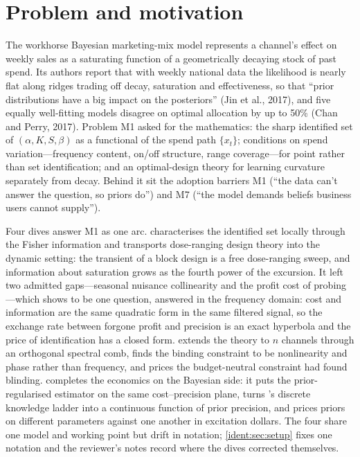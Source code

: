 \section{Problem and motivation}

The workhorse Bayesian marketing-mix model represents a channel's effect on weekly sales as a saturating function of a geometrically decaying stock of past spend. Its authors report that with weekly national data the likelihood is nearly flat along ridges trading off decay, saturation and effectiveness, so that ``prior distributions have a big impact on the posteriors'' (Jin et al., 2017), and five equally well-fitting models disagree on optimal allocation by up to 50\% (Chan and Perry, 2017). Problem M1 asked for the mathematics: the sharp identified set of $(\alpha, K, S, \beta)$ as a functional of the spend path $\{x_t\}$; conditions on spend variation---frequency content, on/off structure, range coverage---for point rather than set identification; and an optimal-design theory for learning curvature separately from decay. Behind it sit the adoption barriers M1 (``the data can't answer the question, so priors do'') and M7 (``the model demands beliefs business users cannot supply'').

Four dives answer M1 as one arc.  characterises the identified set locally through the Fisher information and transports dose-ranging design theory into the dynamic setting: the transient of a block design is a free dose-ranging sweep, and information about saturation grows as the fourth power of the excursion. It left two admitted gaps---seasonal nuisance collinearity and the profit cost of probing---which  shows to be one question, answered in the frequency domain: cost and information are the same quadratic form in the same filtered signal, so the exchange rate between forgone profit and precision is an exact hyperbola and the price of identification has a closed form.  extends the theory to $n$ channels through an orthogonal spectral comb, finds the binding constraint to be nonlinearity and phase rather than frequency, and prices the budget-neutral constraint  had found blinding.  completes the economics on the Bayesian side: it puts the prior-regularised estimator on the same cost--precision plane, turns 's discrete knowledge ladder into a continuous function of prior precision, and prices priors on different parameters against one another in excitation dollars. The four share one model and working point but drift in notation; \cref{ident:sec:setup} fixes one notation and the reviewer's notes record where the dives corrected themselves.

